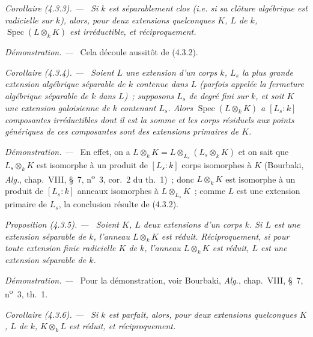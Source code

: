 \documentclass[10pt,oneside]{book}
\newenvironment{proposition}[1][]{%
  \par\medskip\noindent\itshape Proposition (#1). ---\ }{\par}
\newenvironment{corollary}[1][]{%
  \par\medskip\noindent\itshape Corollaire (#1). ---\ }{\par}
\newenvironment{proof}{%
  \par\medskip\noindent\textit{Démonstration. ---\ }}{\par}
\begin{document}
\begin{corollary}[4.3.3]
\label{IV.2.4.3.3-fr}
Si $k$ est séparablement clos (i.e. si sa clôture algébrique est radicielle sur
$k$), alors, pour deux extensions quelconques $K$, $L$ de $k$,
$\operatorname{Spec}(L\otimes_k K)$ est irréductible, et réciproquement.
\end{corollary}

\begin{proof}
Cela découle aussitôt de (4.3.2).
\end{proof}

\begin{corollary}[4.3.4]
\label{IV.2.4.3.4-fr}
Soient $L$ une extension d'un corps $k$, $L_s$ la plus grande extension
algébrique séparable de $k$ contenue dans $L$ (parfois appelée la
\emph{fermeture algébrique séparable} de $k$ dans $L$)~; supposons $L_s$ de
degré fini sur $k$, et soit $K$ une extension galoisienne de $k$ contenant
$L_s$. Alors $\operatorname{Spec}(L\otimes_k K)$ a $[L_s:k]$ composantes
irréductibles dont il est la somme et les corps résiduels aux points génériques
de ces composantes sont des extensions primaires de $K$.
\end{corollary}

\begin{proof}
En effet, on a $L\otimes_k K=L\otimes_{L_s}(L_s\otimes_k K)$ et on sait que
$L_s\otimes_k K$ est isomorphe à un produit de $[L_s:k]$ corps isomorphes à
$K$ (Bourbaki, \emph{Alg.}, chap.~VIII, \S~7, n\textsuperscript{o}~3,
cor.~2 du th.~1)~; donc $L\otimes_k K$ est isomorphe à un produit de
$[L_s:k]$ anneaux isomorphes à $L\otimes_{L_s}K$~; comme $L$ est une
extension primaire de $L_s$, la conclusion résulte de (4.3.2).
\end{proof}

\begin{proposition}[4.3.5]
\label{IV.2.4.3.5-fr}
Soient $K$, $L$ deux extensions d'un corps $k$. Si $L$ est une extension
séparable de $k$, l'anneau $L\otimes_k K$ est réduit. Réciproquement, si pour
toute extension finie radicielle $K$ de $k$, l'anneau $L\otimes_k K$ est
réduit, $L$ est une extension séparable de $k$.
\end{proposition}

\begin{proof}
Pour la démonstration, voir Bourbaki, \emph{Alg.}, chap.~VIII, \S~7,
n\textsuperscript{o}~3, th.~1.
\end{proof}

\begin{corollary}[4.3.6]
\label{IV.2.4.3.6-fr}
Si $k$ est parfait, alors, pour deux extensions quelconques $K$, $L$ de $k$,
$K\otimes_k L$ est réduit, et réciproquement.
\end{corollary}
\end{document}
